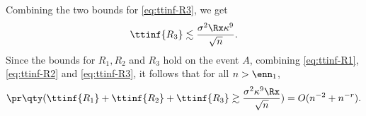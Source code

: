 \documentclass[10pt]{article}
\begin{document}
Combining the two bounds for \cref{eq:ttinf-R3}, we get
\begin{align}
    \ttinf{R_3} \lesssim \frac{ \sigma ^2\Rx\kappa^{9}}{\sqrt{n}}.\label{eq:ttinf-R3}
\end{align}
Since the bounds for $R_1, R_2$ and $R_3$ hold on the event $A$, combining \cref{eq:ttinf-R1}, \cref{eq:ttinf-R2} and \cref{eq:ttinf-R3}, it follows that for all $n > \enn_1$,
\begin{align}
    \pr\qty(\ttinf{R_1} + \ttinf{R_2} + \ttinf{R_3} \gtrsim \frac{ \sigma ^2\kappa^9\Rx}{\sqrt{n}}) = O(n^{-2} + n^{-r}).\label{eq:ttinf-R13-prob}
\end{align}
\end{document}
